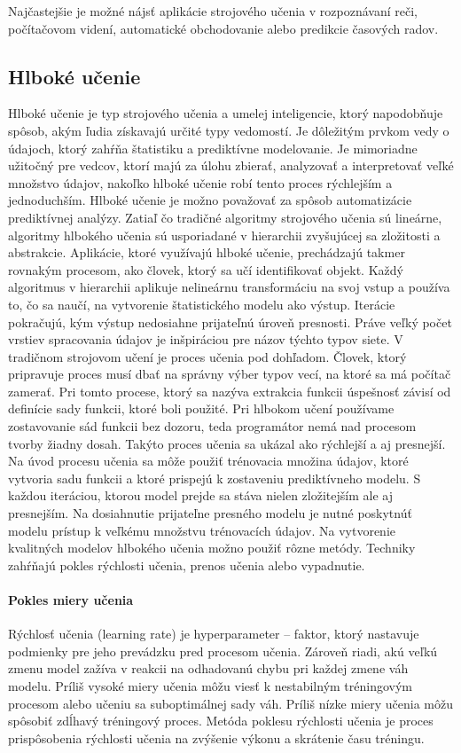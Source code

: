 Najčastejšie je možné nájsť aplikácie strojového učenia v rozpoznávaní reči, počítačovom videní, automatické obchodovanie alebo predikcie časových radov.

\subsection{Hlboké učenie}
Hlboké učenie je typ strojového učenia a umelej inteligencie, ktorý napodobňuje spôsob, akým ľudia získavajú určité typy vedomostí. Je dôležitým prvkom vedy o údajoch, ktorý zahŕňa štatistiku a prediktívne modelovanie. Je mimoriadne užitočný pre vedcov, ktorí majú za úlohu zbierať, analyzovať a interpretovať veľké množstvo údajov, nakoľko hlboké učenie robí tento proces rýchlejším a jednoduchším.
Hlboké učenie je možno považovať za spôsob automatizácie prediktívnej analýzy. Zatiaľ čo tradičné algoritmy strojového učenia sú lineárne, algoritmy hlbokého učenia sú usporiadané v hierarchii zvyšujúcej sa zložitosti a abstrakcie.
Aplikácie, ktoré využívajú hlboké učenie, prechádzajú takmer rovnakým procesom, ako človek, ktorý sa učí identifikovať objekt. Každý algoritmus v hierarchii aplikuje nelineárnu transformáciu na svoj vstup a používa to, čo sa naučí, na vytvorenie štatistického modelu ako výstup. Iterácie pokračujú, kým výstup nedosiahne prijateľnú úroveň presnosti. Práve veľký počet vrstiev spracovania údajov je inšpiráciou pre názov týchto typov siete.
V tradičnom strojovom učení je proces učenia pod dohľadom. Človek, ktorý pripravuje proces musí dbať na správny výber typov vecí, na ktoré sa má počítač zamerať. Pri tomto procese, ktorý sa nazýva extrakcia funkcii úspešnosť závisí od definície sady funkcii, ktoré boli použité. Pri hlbokom učení používame zostavovanie sád funkcii bez dozoru, teda programátor nemá nad procesom tvorby žiadny dosah. Takýto proces učenia sa ukázal ako rýchlejší a aj presnejší.
Na úvod procesu učenia sa môže použiť trénovacia množina údajov, ktoré vytvoria sadu funkcii a ktoré prispejú k zostaveniu prediktívneho modelu. S každou iteráciou, ktorou model prejde sa stáva nielen zložitejším ale aj presnejším. Na dosiahnutie prijateľne presného modelu je nutné poskytnúť modelu prístup k veľkému množstvu trénovacích údajov.
Na vytvorenie kvalitných modelov hlbokého učenia možno použiť rôzne metódy. Techniky zahŕňajú pokles rýchlosti učenia, prenos učenia alebo vypadnutie.
\paragraph{Pokles miery učenia} Rýchlosť učenia (learning rate) je hyperparameter – faktor, ktorý nastavuje podmienky pre jeho prevádzku pred procesom učenia. Zároveň riadi, akú veľkú zmenu model zažíva v reakcii na odhadovanú chybu pri každej zmene váh modelu. Príliš vysoké miery učenia môžu viesť k nestabilným tréningovým procesom alebo učeniu sa suboptimálnej sady váh. Príliš nízke miery učenia môžu spôsobiť zdĺhavý tréningový proces. Metóda poklesu rýchlosti učenia je proces prispôsobenia rýchlosti učenia na zvýšenie výkonu a skrátenie času tréningu.
